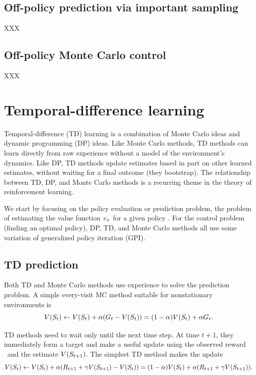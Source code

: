 \subsection{Off-policy prediction via important sampling}

XXX

\subsection{Off-policy Monte Carlo control}

XXX


\section{Temporal-difference learning}

Temporal-difference (TD) learning is a combination of Monte Carlo ideas and dynamic programming (DP) ideas.
Like Monte Carlo methods,
TD methods can learn directly from raw experience without a model of the environment’s dynamics.
Like DP, TD methods update estimates based in part on other learned estimates,
without waiting for a final outcome (they bootstrap).
The relationship between TD, DP, and Monte Carlo methods
is a recurring theme in the theory of reinforcement learning.

We start by focusing on the policy evaluation or prediction problem,
the problem of estimating the value function $v_{\pi}$ for a given policy \pol.
For the control problem (finding an optimal policy),
DP, TD, and Monte Carlo methods all use some variation of generalized policy iteration (GPI).


\subsection{TD prediction}

Both TD and Monte Carlo methods use experience to solve the prediction problem.
A simple every-visit MC method suitable for nonstationary environments is
\begin{equation}
V(S_{t}) \leftarrow
V(S_{t}) + \alpha(G_t - V(S_{t}))
= (1-\alpha) V(S_{t}) + \alpha G_t.
\end{equation}


TD methods need to wait only until the next time step.
At time $t + 1$,
they immediately form a target and make a useful update using the observed reward \
and the estimate $V( S_{t +1})$. The simplest TD method makes the update
\begin{equation}
\label{eq:one-step-update}
V(S_{t}) \leftarrow
V(S_{t}) + \alpha ( R_{t+1} + \gamma V(S_{t+1}) - V(S_{t}))
= (1-\alpha) V(S_{t}) + \alpha ( R_{t+1} + \gamma V(S_{t+1})).
\end{equation}

